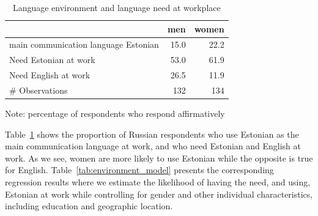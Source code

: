 \documentclass[12pt, a4paper]{article}
\begin{document}
\begin{table}[t]                  
	\centering
	\caption{Language environment and language need at workplace}
	\label{tab:environment_descriptive}
	\begin{tabular}{lrr}
		\toprule
		                                     & men  & women \\
		\midrule
		main communication language Estonian & 15.0 & 22.2  \\
		Need Estonian at work                & 53.0 & 61.9  \\
		Need English  at work                & 26.5 & 11.9  \\
		\midrule
		\# Observations                         & 132  & 134   \\
		\bottomrule
	\end{tabular}
	\begin{flushleft}
		Note: percentage of respondents who respond affirmatively
	\end{flushleft}
\end{table}

Table~\ref{tab:environment_descriptive} shows the proportion of
Russian respondents who use Estonian as the main communication language at work, and
who need Estonian and English at work.  As we see, women are more likely to
use Estonian while the opposite is true for English.
Table~\ref{tab:environment_model} presents the corresponding regression results
where we estimate the likelihood of having the need, and using, Estonian at work
while
controlling for gender and other individual
characteristics, including education and geographic location.
\end{document}

